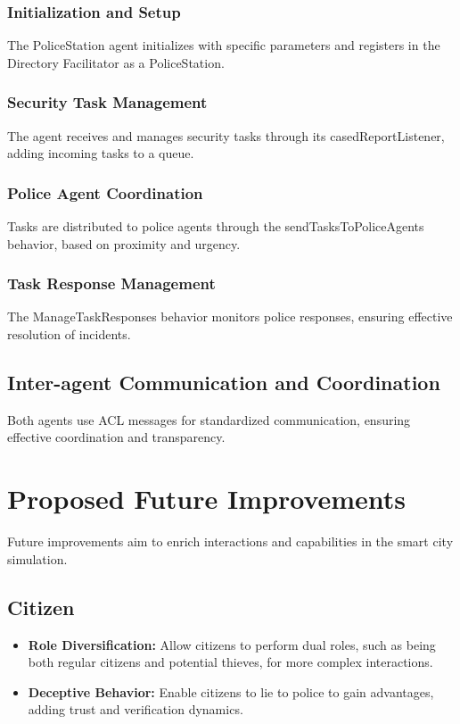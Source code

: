 \documentclass[conference]{IEEEtran}
\begin{document}
  \subsubsection{Initialization and Setup}
  The PoliceStation agent initializes with specific parameters and registers in the Directory Facilitator as a PoliceStation.
  
  \subsubsection{Security Task Management}
  The agent receives and manages security tasks through its casedReportListener, adding incoming tasks to a queue.
  
  \subsubsection{Police Agent Coordination}
  Tasks are distributed to police agents through the sendTasksToPoliceAgents behavior, based on proximity and urgency.
  
  \subsubsection{Task Response Management}
  The ManageTaskResponses behavior monitors police responses, ensuring effective resolution of incidents.
  
  \subsection{Inter-agent Communication and Coordination}
  Both agents use ACL messages for standardized communication, ensuring effective coordination and transparency.
  
  \section{Proposed Future Improvements}
  Future improvements aim to enrich interactions and capabilities in the smart city simulation.
  
  \subsection{Citizen}
  \begin{itemize}
  \item \textbf{Role Diversification:} Allow citizens to perform dual roles, such as being both regular citizens and potential thieves, for more complex interactions.
  \item \textbf{Deceptive Behavior:} Enable citizens to lie to police to gain advantages, adding trust and verification dynamics.
  \end{itemize}
  
\end{document}
